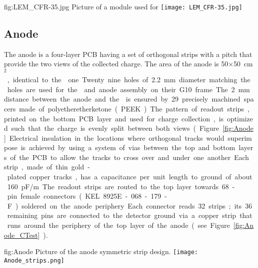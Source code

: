 \begin{dunefigure}
{fig:LEM_CFR-35.jpg}
{Picture of a  module used for  }
\texttt{[image: LEM\_CFR-35.jpg]}
\end{dunefigure}

\subsection{Anode}
\label{sec:fddp-crp-anode}
 
The anode is a four-layer PCB having a set of orthogonal strips with a \dpstrippitch pitch that provide the two views of the collected charge. The area of the anode is  \num{50}$\times$\SI{50}{cm$^2$}, identical to the  one. Twenty nine holes of \SI{2.2}{mm} diameter matching the  holes are used for the  and anode assembly on their G10 frame. The \SI{2}{mm} distance between the anode and the  is ensured by \num{29} precisely machined spacers made of polyetheretherketone (PEEK). 

The pattern of readout strips, printed on the bottom PCB layer and used for charge collection, is optimized such that the charge is evenly split between both views (Figure~\ref{fig:Anode}. Electrical insulation in the locations where orthogonal tracks would superimpose is achieved by 
using a system of vias between the top and bottom layers of the PCB to allow the tracks to cross over and under one another. 
Each strip, made of thin gold-plated copper tracks, has a capacitance per unit length to ground of about 
\SI{160}{pF/m}. The readout strips are routed to the top layer towards \num{68}-pin female connectors (KEL 8925E-068-179-F) soldered on the anode periphery. Each connector reads \num{32} strips; its \num{36} remaining pins are connected to the detector ground via a copper strip that runs around the periphery of the top layer of the anode (see Figure \ref{fig:Anode_CTest}). 

\begin{dunefigure}
{fig:Anode}
{Picture of the anode symmetric \twod strip design.}
  \texttt{[image: Anode\_strips.png]}
\end{dunefigure}

